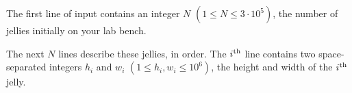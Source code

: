 
The first line of input contains an integer $N$ $(1 \leq N \leq 3 \cdot 10^{5})$, the number of jellies initially on your lab bench.

The next $N$ lines describe these jellies, in order. The $i\textsuperscript{th}$ line contains two space-separated integers $h_i$ and $w_i$ $(1 \leq h_i, w_i \leq 10^{6})$, the height and width of the $i\textsuperscript{th}$ jelly.

